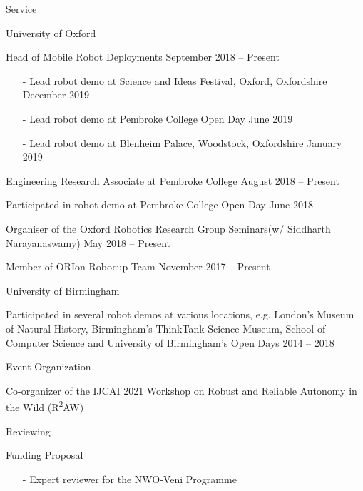 
\begin{rSection}{Service}

\begin{rSubsection}{University of Oxford}{}{}{}
\item Head of Mobile Robot Deployments \hfill  September 2018 -- Present
\begin{itemize}
\vspace*{-0.2cm}
\item[-]  Lead robot demo at Science and Ideas Festival, Oxford, Oxfordshire \hfill December 2019\vspace*{-0.2cm}
\item[-]  Lead robot demo at Pembroke College Open Day \hfill June 2019\vspace*{-0.2cm}
\item[-]  Lead robot demo at Blenheim Palace, Woodstock, Oxfordshire \hfill January 2019
\end{itemize}
\item Engineering Research Associate at Pembroke College \hfill August 2018 -- Present
\item Participated in robot demo at Pembroke College Open Day \hfill June 2018
\item Organiser of the Oxford Robotics Research Group Seminars\newline (w/ Siddharth Narayanaswamy) \hfill May 2018 -- Present
\item Member of ORIon Robocup Team \hfill November 2017 -- Present
\end{rSubsection}


\begin{rSubsection}{University of Birmingham}{}{}{}
\item Participated in several robot demos at various locations, e.g. London's  Museum of Natural History, Birmingham's ThinkTank Science Museum,  School of  Computer Science and University of Birmingham's Open Days \hfill 2014 -- 2018
\end{rSubsection}


\begin{rSubsection}{Event Organization}{}{}{}
\item Co-organizer of the IJCAI 2021 Workshop on  Robust and Reliable Autonomy in the Wild (R\textsuperscript{2}AW)
\end{rSubsection}


\begin{rSubsection}{Reviewing}{}{}{}
\item Funding Proposal
\begin{itemize}
\vspace*{-0.2cm}
\item[-] Expert reviewer for the NWO-Veni Programme
\end{itemize}


\end{rSubsection}
\end{rSection}
